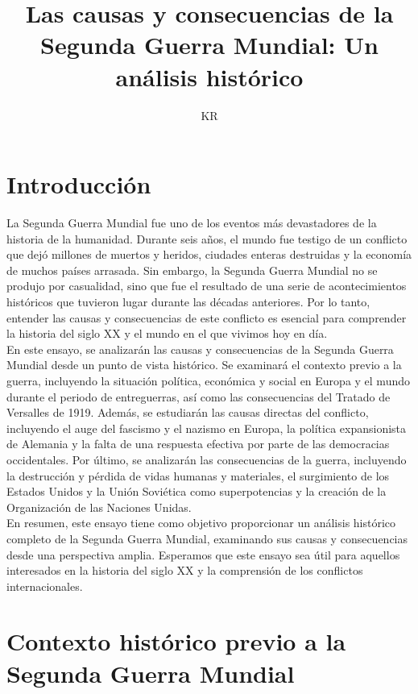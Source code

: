 \documentclass{article}
\title{Las causas y consecuencias de la Segunda Guerra Mundial: Un análisis histórico}
\author{KR}
\theoremstyle{mytheoremstyle}
\theoremstyle{mytheoremstyle}
\theoremstyle{myproblemstyle}
\begin{document}
    \maketitle
    \section{Introducción}
    La Segunda Guerra Mundial fue uno de los eventos más devastadores de la historia de la humanidad. Durante seis años, el mundo fue testigo de un conflicto que dejó millones de muertos y heridos, ciudades enteras destruidas y la economía de muchos países arrasada. Sin embargo, la Segunda Guerra Mundial no se produjo por casualidad, sino que fue el resultado de una serie de acontecimientos históricos que tuvieron lugar durante las décadas anteriores. Por lo tanto, entender las causas y consecuencias de este conflicto es esencial para comprender la historia del siglo XX y el mundo en el que vivimos hoy en día.\\

    En este ensayo, se analizarán las causas y consecuencias de la Segunda Guerra Mundial desde un punto de vista histórico. Se examinará el contexto previo a la guerra, incluyendo la situación política, económica y social en Europa y el mundo durante el periodo de entreguerras, así como las consecuencias del Tratado de Versalles de 1919. Además, se estudiarán las causas directas del conflicto, incluyendo el auge del fascismo y el nazismo en Europa, la política expansionista de Alemania y la falta de una respuesta efectiva por parte de las democracias occidentales. Por último, se analizarán las consecuencias de la guerra, incluyendo la destrucción y pérdida de vidas humanas y materiales, el surgimiento de los Estados Unidos y la Unión Soviética como superpotencias y la creación de la Organización de las Naciones Unidas.\\

    En resumen, este ensayo tiene como objetivo proporcionar un análisis histórico completo de la Segunda Guerra Mundial, examinando sus causas y consecuencias desde una perspectiva amplia. Esperamos que este ensayo sea útil para aquellos interesados en la historia del siglo XX y la comprensión de los conflictos internacionales.\\
\newpage
    \section{Contexto histórico previo a la Segunda Guerra Mundial}
\end{document}
